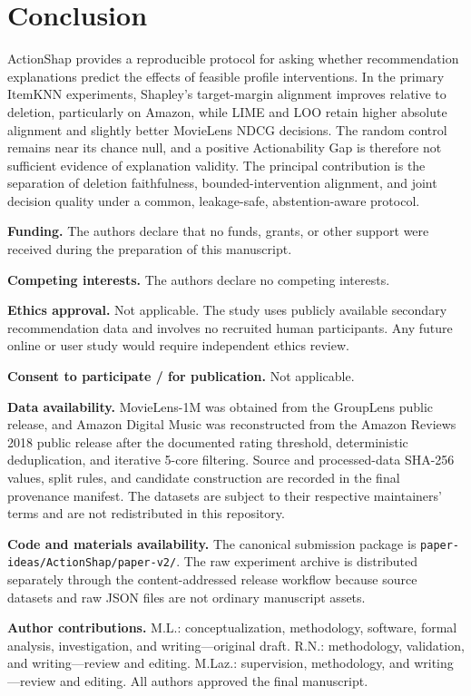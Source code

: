 \documentclass[pdflatex,sn-basic,Numbered]{sn-jnl}
\begin{document}
\section{Conclusion}
ActionShap provides a reproducible protocol for asking whether recommendation explanations predict the effects of feasible profile interventions. In the primary ItemKNN experiments, Shapley’s target-margin alignment improves relative to deletion, particularly on Amazon, while LIME and LOO retain higher absolute alignment and slightly better MovieLens NDCG decisions. The random control remains near its chance null, and a positive Actionability Gap is therefore not sufficient evidence of explanation validity. The principal contribution is the separation of deletion faithfulness, bounded-intervention alignment, and joint decision quality under a common, leakage-safe, abstention-aware protocol.

\textbf{Funding.} The authors declare that no funds, grants, or other support were received during the preparation of this manuscript.

\textbf{Competing interests.} The authors declare no competing interests.

\textbf{Ethics approval.} Not applicable. The study uses publicly available secondary recommendation data and involves no recruited human participants. Any future online or user study would require independent ethics review.

\textbf{Consent to participate / for publication.} Not applicable.

\textbf{Data availability.} MovieLens-1M was obtained from the GroupLens public release, and Amazon Digital Music was reconstructed from the Amazon Reviews 2018 public release after the documented rating threshold, deterministic deduplication, and iterative 5-core filtering. Source and processed-data SHA-256 values, split rules, and candidate construction are recorded in the final provenance manifest. The datasets are subject to their respective maintainers' terms and are not redistributed in this repository.

\textbf{Code and materials availability.} The canonical submission package is \texttt{paper-ideas/ActionShap/paper-v2/}. The raw experiment archive is distributed separately through the content-addressed release workflow because source datasets and raw JSON files are not ordinary manuscript assets.

\textbf{Author contributions.} M.L.: conceptualization, methodology, software, formal analysis, investigation, and writing---original draft. R.N.: methodology, validation, and writing---review and editing. M.Laz.: supervision, methodology, and writing---review and editing. All authors approved the final manuscript.



\end{document}

